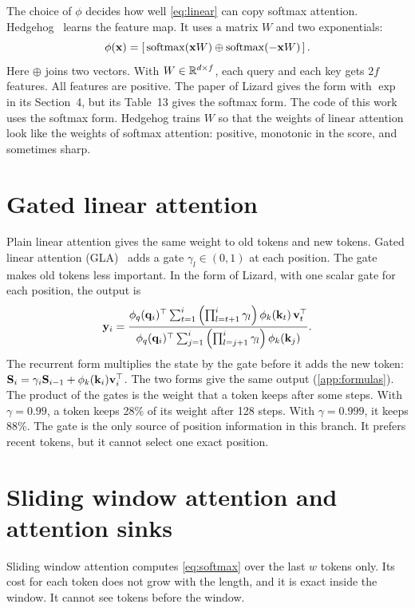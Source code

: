The choice of $\phi$ decides how well \cref{eq:linear} can copy softmax attention. Hedgehog~\cite{hedgehog} learns the feature map. It uses a matrix $W$ and two exponentials:
\begin{equation}
\phi(\mathbf{x}) = \left[\, \mathrm{softmax}(\mathbf{x} W) \oplus \mathrm{softmax}(-\mathbf{x} W) \,\right] .
\label{eq:hedgehog}
\end{equation}
Here $\oplus$ joins two vectors. With $W \in \mathbb{R}^{d \times f}$, each query and each key gets $2f$ features. All features are positive. The paper of Lizard gives the form with $\exp$ in its Section~4, but its Table~13 gives the softmax form. The code of this work uses the softmax form. Hedgehog trains $W$ so that the weights of linear attention look like the weights of softmax attention: positive, monotonic in the score, and sometimes sharp.

\section{Gated linear attention}
\label{sec:gla}

Plain linear attention gives the same weight to old tokens and new tokens. Gated linear attention (GLA)~\cite{gla} adds a gate $\gamma_l \in (0, 1)$ at each position. The gate makes old tokens less important. In the form of Lizard, with one scalar gate for each position, the output is
\begin{equation}
\mathbf{y}_i = \frac{\phi_q(\mathbf{q}_i)^\top \sum_{t=1}^{i} \left( \prod_{l=t+1}^{i} \gamma_l \right) \phi_k(\mathbf{k}_t)\, \mathbf{v}_t^\top}
{\phi_q(\mathbf{q}_i)^\top \sum_{j=1}^{i} \left( \prod_{l=j+1}^{i} \gamma_l \right) \phi_k(\mathbf{k}_j)} .
\label{eq:gla}
\end{equation}
The recurrent form multiplies the state by the gate before it adds the new token: $\mathbf{S}_i = \gamma_i \mathbf{S}_{i-1} + \phi_k(\mathbf{k}_i)\mathbf{v}_i^\top$. The two forms give the same output (\cref{app:formulas}). The product of the gates is the weight that a token keeps after some steps. With $\gamma = 0.99$, a token keeps 28\% of its weight after 128 steps. With $\gamma = 0.999$, it keeps 88\%. The gate is the only source of position information in this branch. It prefers recent tokens, but it cannot select one exact position.

\section{Sliding window attention and attention sinks}
\label{sec:swa}

Sliding window attention computes \cref{eq:softmax} over the last $w$ tokens only. Its cost for each token does not grow with the length, and it is exact inside the window. It cannot see tokens before the window.

